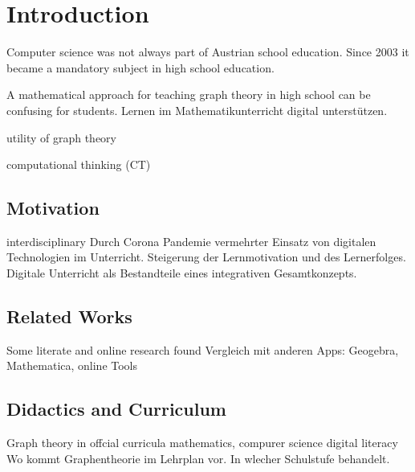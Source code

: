 \chapter{Introduction}\label{sec:intro}
Computer science was not always part of Austrian school education. Since 2003 it became a mandatory subject in high school education. 

A mathematical approach for teaching graph theory in high school can be confusing for students.  
Lernen im Mathematikunterricht digital unterst\"utzen.

utility of graph theory

computational thinking (CT)

\section{Motivation}\label{sec:motivation}
interdisciplinary
Durch Corona Pandemie vermehrter Einsatz von digitalen Technologien im Unterricht.
Steigerung der Lernmotivation und des Lernerfolges.
Digitale Unterricht als Bestandteile eines integrativen Gesamtkonzepts.

\section{Related Works}\label{sec:works}
Some literate and online research found  
Vergleich mit anderen Apps:
Geogebra, Mathematica, online Tools


\section{Didactics and Curriculum}\label{sec:lehrplan}

Graph theory in offcial curricula
mathematics, compurer science
digital literacy
Wo kommt Graphentheorie im Lehrplan vor. In wlecher Schulstufe behandelt. 


